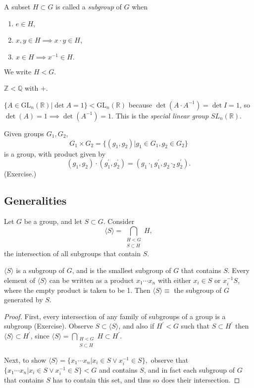 \documentclass{article}
\begin{document}
\begin{defn}[Subgroup]
  \label{def:subgroup}
  A subset $H \subset G$ is called a \emph{subgroup} of $G$ when
  \begin{enumerate}
    \item{$e \in H$,}
    \item{$x, y \in H \implies x \cdot y \in H$,}
    \item{$x \in H \implies x^{-1} \in H.$}
  \end{enumerate}
  We write $H < G$.
\end{defn}

\begin{xmpl}
  \item{$\mathbb{Z} < \mathbb{Q}$ with $+$.}
  \item{$\{A \in \mathrm{GL}_n(\mathbb{R}) | \det A = 1\} < \mathrm{GL}_n(\mathbb{R})$
        because $\det (A \cdot A^{-1}) = \det I = 1$, 
        so $\det(A) = 1 \implies \det(A^{-1}) = 1$. This is the
        \emph{special linear group} $SL_n(\mathbb{R})$.
       }
\end{xmpl}

\begin{defn}
  Given groups $G_1, G_2$, 
  $$
  G_1 \times G_2 = \{(g_1, g_2) | g_1 \in G_1, g_2 \in G_2 \}
  $$
  is a group, with product given by
  $$
  (g_1, g_2) \cdot (g_1^\prime, g_2^\prime) 
  = (g_1 \cdot_1 g_1^\prime, g_2 \cdot_2 g_2^\prime).
  $$
  (Exercise.)
\end{defn}

\subsection{Generalities}
Let $G$ be a group, and let $S \subset G$. Consider
$$
\langle S \rangle = \bigcap_{\substack{H < G \\ S \subset H}} H,
$$
the intersection of all subgroups that contain $S$.

\begin{prop}
$\langle S \rangle$ is a subgroup of $G$, and is the smallest
subgroup of $G$ that contains $S$. Every element of $\langle S \rangle$
can be written as a product $x_1 \cdots x_n$ with either $x_i \in S$ or
$x_i^{-1} S$, where the empty product is taken to be 1. Then
$\langle S \rangle \equiv$ the subgroup of $G$ generated by $S$.
\end{prop}

\begin{proof}
First, every intersection of any family of subgroups of a group is a
subgroup (Exercise). Observe $S \subset \langle S \rangle$, and also if
$H^\prime < G$ such that $S \subset H^\prime$ then 
$\langle S \rangle \subset H^\prime$, since 
$\langle S \rangle = \bigcap_{\substack{H < G \\ S \subset H}} H \subset H^\prime$.

Next, to show
$\langle S \rangle = \{ x_1 \cdots x_n | x_i \in S \lor x_i^{-1} \in S \},$
observe that $\{ x_1 \cdots x_n | x_i \in S \lor x_i^{-1} \in S \} < G$ and
contains $S$, and in fact each subgroup of $G$ that contains $S$ has to
contain this set, and thus so does their intersection.
\end{proof}
\end{document}
